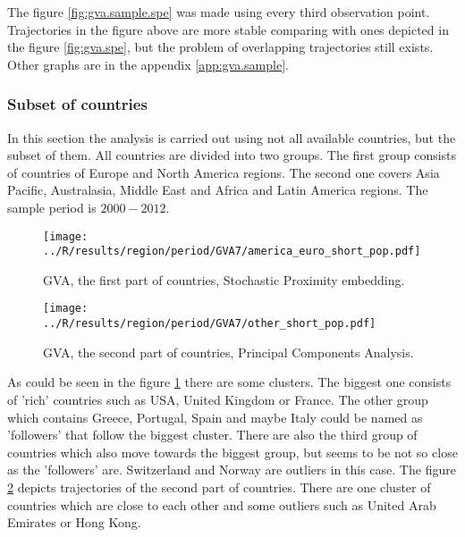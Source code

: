 \documentclass[a4paper]{article}
\begin{document}
The figure \ref{fig:gva.sample.spe} was made using every third observation point. Trajectories in the figure above are more stable comparing with ones depicted in the figure \ref{fig:gva.spe}, but the problem of overlapping trajectories still exists. Other graphs are in the appendix \ref{app:gva.sample}.

\subsubsection{Subset of countries}
\label{sec:gva.region}
In this section the analysis is carried out using not all available countries, but the subset of them. All countries are divided into two groups. The first group consists of countries of Europe and North America regions. The second one covers Asia Pacific, Australasia, Middle East and Africa and Latin America regions. The sample period is $2000-2012$.

\begin{figure}[!htbp]
\begin{center}
\texttt{[image: ../R/results/region/period/GVA7/america\_euro\_short\_pop.pdf]}
\caption{GVA, the first part of countries, Stochastic Proximity embedding.}
\label{fig:gva.region.first.spe}
\end{center}
\end{figure}

\begin{figure}[!htbp]
\begin{center}
\texttt{[image: ../R/results/region/period/GVA7/other\_short\_pop.pdf]}
\caption{GVA, the second part of countries, Principal Components Analysis.}
\label{fig:gva.region.second.pca}
\end{center}
\end{figure}

As could be seen in the figure \ref{fig:gva.region.first.spe} there are some clusters. The biggest one consists of 'rich' countries such as USA, United Kingdom or France. The other group which contains Greece, Portugal, Spain and maybe Italy could be named as 'followers' that follow the biggest cluster. There are also the third group of countries which also move towards the biggest group, but seems to be not so close as the 'followers' are. Switzerland and Norway are outliers in this case. The figure \ref{fig:gva.region.second.pca} depicts trajectories of the second part of countries. There are one cluster of countries which are close to each other and some outliers such as United Arab Emirates or Hong Kong.
\end{document}
